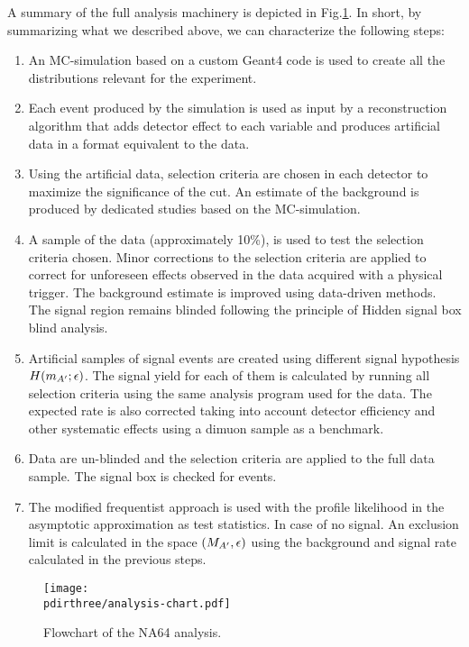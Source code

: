 A summary of the full analysis machinery is depicted in Fig.\ref{fig:analysis-chart}. In short, by summarizing what we described above, we can characterize the following steps:

\begin{enumerate}
\item An MC-simulation based on a custom Geant4 code is used to create all the distributions relevant for the experiment.
\item Each event produced by the simulation is used as input by a reconstruction algorithm that adds detector effect to each variable and produces artificial data in a format equivalent to the data.
\item Using the artificial data, selection criteria are chosen in each detector to maximize the significance of the cut. An estimate of the background is produced by dedicated studies based on the MC-simulation.
\item A sample of the data (approximately 10\%), is used to test the selection criteria chosen. Minor corrections to the selection criteria are applied to correct for unforeseen effects observed in the data acquired with a physical trigger. The background estimate is improved using data-driven methods. The signal region remains blinded following the principle of Hidden signal box blind analysis.
\item Artificial samples of signal events are created using different signal hypothesis $H(m_{A'};\epsilon)$. The signal yield for each of them is calculated by running all selection criteria using the same analysis program used for the data. The expected rate is also corrected taking into account detector efficiency and other systematic effects using a dimuon sample as a benchmark.  
\item Data are un-blinded and the selection criteria are applied to the full data sample. The signal box is checked for events.
\item The modified frequentist approach is used with the profile likelihood in the asymptotic approximation as test statistics. In case of no signal. An exclusion limit is calculated in the space $(M_{A'},\epsilon)$ using the background and signal rate calculated in the previous steps.
\end{enumerate}

\begin{figure}[bth!]
  \centering
  \texttt{[image: \\pdirthree/analysis-chart.pdf]}
  \caption{Flowchart of the NA64 analysis.}
  \label{fig:analysis-chart}
\end{figure}

